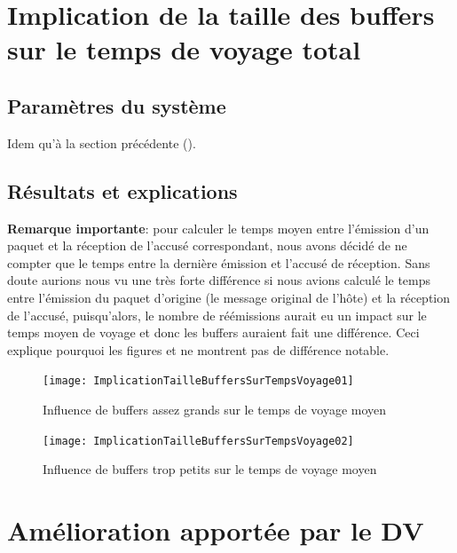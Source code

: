 \documentclass[a4paper,11pt]{article}
\begin{document}
\section{Implication de la taille des buffers sur le temps de voyage total}
\subsection{Paramètres du système}
Idem qu'à la section précédente ().


\subsection{Résultats et explications}
\textbf{Remarque importante}: pour calculer le temps moyen entre l'émission d'un paquet et la réception de l'accusé correspondant, nous avons décidé de ne compter que le temps entre la dernière émission et l'accusé de réception. Sans doute aurions nous vu une très forte différence si nous avions calculé le temps entre l'émission du paquet d'origine (le message original de l'hôte) et la réception de l'accusé, puisqu'alors, le nombre de réémissions aurait eu un impact sur le temps moyen de voyage et donc les buffers auraient fait une différence. Ceci explique pourquoi les figures  et  ne montrent pas de différence notable.

\begin{figure}[h!t]
  \centering
    \texttt{[image: ImplicationTailleBuffersSurTempsVoyage01]}
  \caption{Influence de buffers assez grands sur le temps de voyage moyen}
  \label{fig:ImplicationTailleBuffersSurTempsVoyage01}
\end{figure}

\begin{figure}[h!t]
  \centering
    \texttt{[image: ImplicationTailleBuffersSurTempsVoyage02]}
  \caption{Influence de buffers trop petits sur le temps de voyage moyen}
  \label{fig:ImplicationTailleBuffersSurTempsVoyage02}
\end{figure}









\section{Amélioration apportée par le DV}\label{dv}
\end{document}
